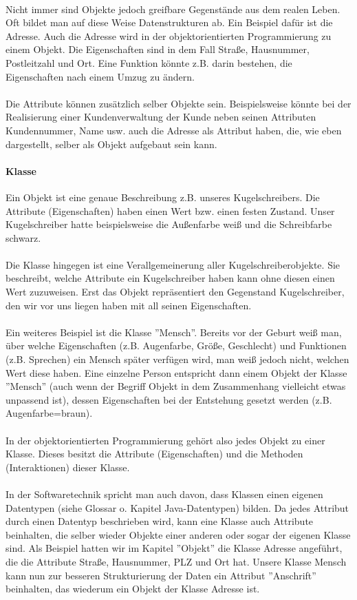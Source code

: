\\
Nicht immer sind Objekte jedoch greifbare Gegenstände aus dem realen Leben. Oft bildet man auf diese Weise Datenstrukturen ab. Ein Beispiel dafür ist die Adresse. Auch die Adresse wird in der objektorientierten Programmierung zu einem Objekt. Die Eigenschaften sind in dem Fall Straße, Hausnummer, Postleitzahl und Ort. Eine Funktion könnte z.B. darin bestehen, die Eigenschaften nach einem Umzug zu ändern.\\
\\
Die Attribute können zusätzlich selber Objekte sein. Beispielsweise könnte bei der Realisierung einer Kundenverwaltung der Kunde neben seinen Attributen Kundennummer, Name usw. auch die Adresse als Attribut haben, die, wie eben dargestellt, selber als Objekt aufgebaut sein kann.

\paragraph{Klasse}
Ein Objekt ist eine genaue Beschreibung z.B. unseres Kugelschreibers. Die Attribute (Eigenschaften) haben  einen Wert bzw. einen festen Zustand. Unser Kugelschreiber hatte beispielsweise die Außenfarbe weiß und die Schreibfarbe schwarz.\\
\\
Die Klasse hingegen ist eine Verallgemeinerung aller Kugelschreiberobjekte. Sie beschreibt, welche Attribute ein Kugelschreiber haben kann ohne diesen einen Wert zuzuweisen. Erst das Objekt repräsentiert den Gegenstand Kugelschreiber, den wir vor uns liegen haben mit  all seinen Eigenschaften.\\
\\
Ein weiteres Beispiel ist die Klasse ''Mensch''. Bereits vor der Geburt weiß man, über welche Eigenschaften (z.B. Augenfarbe, Größe, Geschlecht) und Funktionen (z.B. Sprechen) ein Mensch später verfügen wird, man weiß jedoch nicht, welchen Wert diese haben. Eine einzelne Person entspricht dann einem Objekt der Klasse ''Mensch'' (auch wenn der Begriff Objekt in dem Zusammenhang vielleicht etwas unpassend ist), dessen Eigenschaften bei der Entstehung gesetzt werden (z.B. Augenfarbe=braun).\\
\\
In der objektorientierten Programmierung  gehört also jedes Objekt zu einer Klasse. Dieses besitzt die Attribute (Eigenschaften) und die Methoden (Interaktionen) dieser Klasse.\\
\\
In der Softwaretechnik spricht man auch davon, dass Klassen einen eigenen Datentypen (siehe Glossar o. Kapitel Java-Datentypen) bilden. Da jedes Attribut durch einen Datentyp beschrieben wird, kann eine Klasse auch Attribute beinhalten, die selber wieder Objekte einer anderen oder sogar der eigenen Klasse sind. Als Beispiel hatten wir im Kapitel ''Objekt'' die Klasse Adresse angeführt, die die Attribute Straße, Hausnummer, PLZ und Ort hat. Unsere Klasse Mensch kann nun zur besseren Strukturierung der Daten  ein Attribut ''Anschrift'' beinhalten, das wiederum ein Objekt der Klasse Adresse ist.\\
